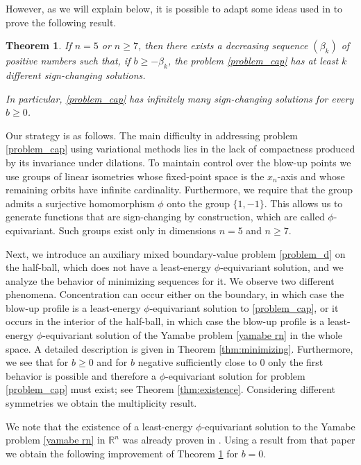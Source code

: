 \documentclass[reqno,11pt,oneside]{amsart}
\newtheorem{theorem}{Theorem}[section]
\numberwithin{equation}{section}
\def\rn{\mathbb{R}^n}
\begin{document}
However, as we will explain below, it is possible to adapt some ideas used in \cite{c} to prove the following result.

\begin{theorem} \label{thm:main_cap}
If $n=5$ or $n\geq 7$, then there exists a decreasing sequence $(\beta_k)$ of positive numbers such that, if $b\geq -\beta_k$, the problem \eqref{problem_cap} has at least $k$ different sign-changing solutions.

In particular, \eqref{problem_cap} has infinitely many sign-changing solutions for every $b\geq 0$.
\end{theorem}

Our strategy is as follows. The main difficulty in addressing problem \eqref{problem_cap} using variational methods lies in the lack of compactness produced by its invariance under dilations. To maintain control over the blow-up points we use groups of linear isometries whose fixed-point space is the $x_n$-axis and whose remaining orbits have infinite cardinality. Furthermore, we require that the group admits a surjective homomorphism $\phi$ onto the group $\{1,-1\}$. This allows us to generate functions that are sign-changing by construction, which are called $\phi$-equivariant. Such groups exist only in dimensions $n=5$ and $n\geq 7$.

Next, we introduce an auxiliary mixed boundary-value problem \eqref{problem_d} on the half-ball, which does not have a least-energy $\phi$-equivariant solution, and we analyze the behavior of minimizing sequences for it. We observe two different phenomena. Concentration can occur either on the boundary, in which case the blow-up profile is a least-energy $\phi$-equivariant solution to \eqref{problem_cap}, or it occurs in the interior of the half-ball, in which case the blow-up profile is a least-energy $\phi$-equivariant solution of the Yamabe problem \eqref{yamabe rn} in the whole space. A detailed description is given in Theorem \ref{thm:minimizing}. Furthermore, we see that for $b\geq 0$ and for $b$ negative sufficiently close to $0$ only the first behavior is possible and therefore a $\phi$-equivariant solution for problem \eqref{problem_cap} must exist; see Theorem \ref{thm:existence}. Considering different symmetries we obtain the multiplicity result.

We note that the existence of a least-energy $\phi$-equivariant solution to the Yamabe problem \eqref{yamabe rn} in $\rn$ was already proven in \cite{c}. Using a result from that paper we obtain the following improvement of Theorem \ref{thm:main_cap} for $b=0$.
\end{document}
